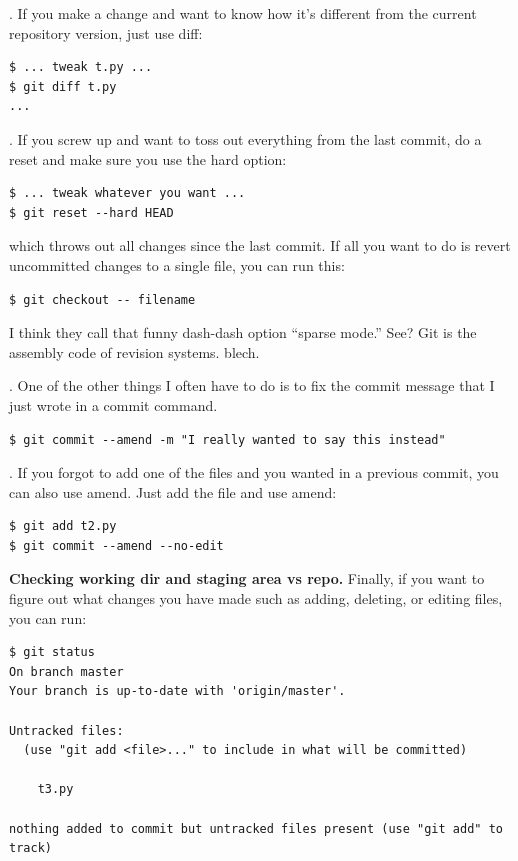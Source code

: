 \documentclass[titlepage]{tufte-book}
\begin{document}
. If you make a change and want to know how it's different from the current repository version, just use diff:

\begin{lstlisting}[style=BashInputStyle]
$ ... tweak t.py ...
$ git diff t.py
...
\end{lstlisting}

. If you screw up and want to toss out everything from the last commit, do a reset and make sure you use the hard option:

\begin{lstlisting}[style=BashInputStyle]
$ ... tweak whatever you want ...
$ git reset --hard HEAD
\end{lstlisting}

\noindent which throws out all changes since the last commit. If all you want to do is revert uncommitted changes to a single file, you can run this:

\begin{lstlisting}[style=BashInputStyle]
$ git checkout -- filename
\end{lstlisting}

I think they call that funny dash-dash option ``sparse mode.'' See? Git is the assembly code of revision systems. blech.

. One of the other things I often have to do is to fix the commit message that I just wrote in a commit command.

\begin{lstlisting}[style=BashInputStyle]
$ git commit --amend -m "I really wanted to say this instead"
\end{lstlisting}

. If you forgot to add one of the files and you wanted in a previous commit, you can also use amend. Just add the file and use amend:

\begin{lstlisting}[style=BashInputStyle]
$ git add t2.py
$ git commit --amend --no-edit
\end{lstlisting}

{\bf Checking working dir and staging area vs repo.} Finally, if you want to figure out what changes you have made such as adding, deleting, or editing files, you can run:

\begin{lstlisting}[style=BashInputStyle]
$ git status
On branch master
Your branch is up-to-date with 'origin/master'.

Untracked files:
  (use "git add <file>..." to include in what will be committed)

    t3.py

nothing added to commit but untracked files present (use "git add" to track)
\end{lstlisting}
\end{document}
